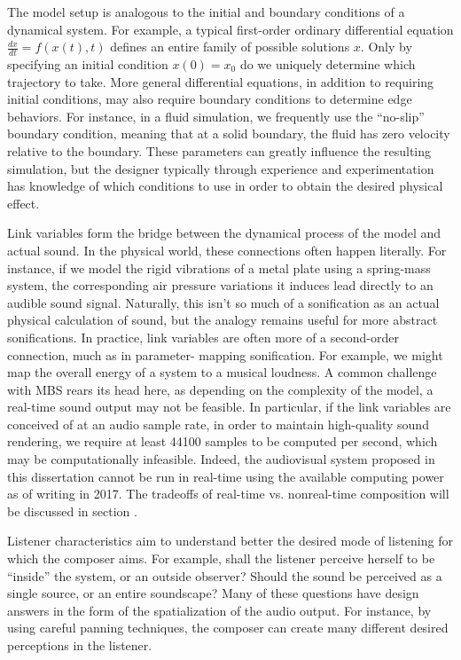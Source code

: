 The model setup is analogous to the initial and boundary conditions of a 
dynamical system. For example, a typical first-order ordinary differential 
equation $\frac{dx}{dt} = f(x(t), t)$ defines an entire family of possible 
solutions $x$. Only by specifying an initial condition $x(0) = x_0$ do we 
uniquely determine which trajectory to take. More general differential 
equations, in addition to requiring initial conditions, may also require 
boundary conditions to determine edge behaviors. For instance, in a fluid 
simulation, we frequently use the ``no-slip'' boundary condition, meaning 
that at a solid boundary, the fluid has zero velocity relative to the 
boundary. These parameters can greatly influence the resulting simulation, 
but the designer typically through experience and experimentation has 
knowledge of which conditions to use in order to obtain the desired physical 
effect.

Link variables form the bridge between the dynamical process of the model and 
actual sound. In the physical world, these connections often happen 
literally. For instance, if we model the rigid vibrations of a metal plate 
using a spring-mass system, the corresponding air pressure variations it 
induces lead directly to an audible sound signal. Naturally, this isn't so 
much of a sonification as an actual physical calculation of sound, but the 
analogy remains useful for more abstract sonifications. In practice, link 
variables are often more of a second-order connection, much as in parameter-
mapping sonification. For example, we might map the overall energy of a 
system to a musical loudness. A common challenge with MBS rears its head 
here, as depending on the complexity of the model, a real-time sound output 
may not be feasible. In particular, if the link variables are conceived of at 
an audio sample rate, in order to maintain high-quality sound rendering, we 
require at least 44100 samples to be computed per second, which may be 
computationally infeasible. Indeed, the audiovisual system proposed in this 
dissertation cannot be run in real-time using the available computing power 
as of writing in 2017. The tradeoffs of real-time vs. nonreal-time 
composition will be discussed in section .

Listener characteristics aim to understand better the desired mode of 
listening for which the composer aims. For example, shall the listener 
perceive herself to be ``inside'' the system, or an outside observer? Should 
the sound be perceived as a single source, or an entire soundscape? Many of 
these questions have design answers in the form of the spatialization of the 
audio output. For instance, by using careful panning techniques, the composer 
can create many different desired perceptions in the listener.

